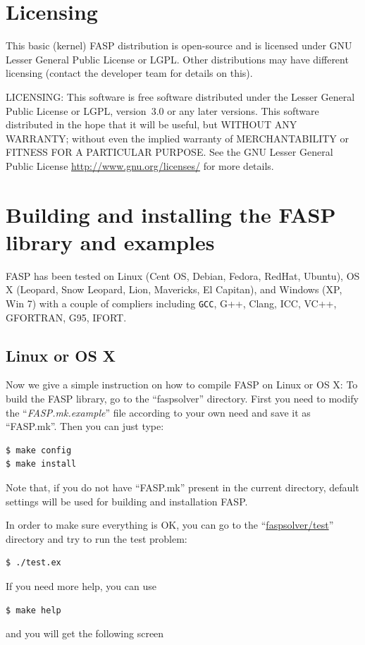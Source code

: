 \documentclass[11pt]{memoir}
\begin{document}
\section{Licensing} This basic (kernel) FASP distribution is
open-source and is licensed under GNU Lesser General Public License or
LGPL. Other distributions may have different licensing (contact the
developer team for details on this).

\begin{snugshade}\noindent
  LICENSING: This software is free software distributed under the Lesser
  General Public License or LGPL, version~3.0 or any later
  versions. This software distributed in the hope that it will be
  useful, but WITHOUT ANY WARRANTY; without even the implied warranty
  of MERCHANTABILITY or FITNESS FOR A PARTICULAR PURPOSE. See the GNU
  Lesser General Public License \url{http://www.gnu.org/licenses/} for
  more details.
\end{snugshade}



\section{Building and installing the FASP library and examples}\label{sec:build}

FASP has been tested on Linux (Cent OS, Debian, Fedora, RedHat,
Ubuntu), OS X (Leopard, Snow Leopard, Lion, Mavericks, El Capitan),
and Windows (XP, Win 7) with a couple of compliers including \verb|GCC|, G++,
Clang, ICC, VC++, GFORTRAN, G95, IFORT.

\subsection{Linux or OS X}

Now we give a simple instruction on how to compile FASP on Linux or OS X: To build the FASP library,  go to the ``faspsolver'' directory. First you need to modify the ``\emph{FASP.mk.example}'' file according to your own need and save it as ``{\color{red}FASP.mk}''. Then you can just type:
%
\begin{lstlisting}[numbers=none]
$ make config
$ make install
\end{lstlisting}
%
Note that, if you do not have ``FASP.mk'' present in the current directory, default settings will be used for building and installation FASP. 

In order to make sure everything is OK, you can go to the ``\url{faspsolver/test}'' directory and try to run the test problem:
%
\begin{lstlisting}[numbers=none]
$ ./test.ex
\end{lstlisting}
%
If you need more help, you can use
%
\begin{lstlisting}[numbers=none]
$ make help
\end{lstlisting}
%
and you will get the following screen

\end{document}
